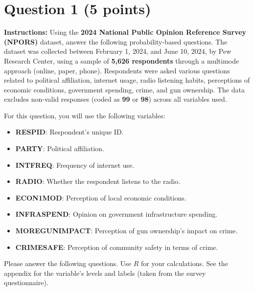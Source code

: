 \documentclass[11pt]{article}
\begin{document}
\newpage
\section*{Question 1 (5 points)}

\textbf{Instructions:} Using the \textbf{2024 National Public Opinion Reference Survey (NPORS)} dataset, answer the following probability-based questions. The dataset was collected between February 1, 2024, and June 10, 2024, by Pew Research Center, using a sample of \textbf{5,626 respondents} through a multimode approach (online, paper, phone). Respondents were asked various questions related to political affiliation, internet usage, radio listening habits, perceptions of economic conditions, government spending, crime, and gun ownership. The data excludes non-valid responses (coded as \textbf{99} or \textbf{98}) across all variables used.

For this question, you will use the following variables:
\begin{itemize}
    \item \textbf{RESPID}: Respondent’s unique ID.
    \item \textbf{PARTY}: Political affiliation.
    \item \textbf{INTFREQ}: Frequency of internet use.
    \item \textbf{RADIO}: Whether the respondent listens to the radio.
    \item \textbf{ECON1MOD}: Perception of local economic conditions.
    \item \textbf{INFRASPEND}: Opinion on government infrastructure spending.
    \item \textbf{MOREGUNIMPACT}: Perception of gun ownership's impact on crime.
    \item \textbf{CRIMESAFE}: Perception of community safety in terms of crime.
\end{itemize}

\noindent Please answer the following questions. Use $R$ for your calculations. See the appendix for the variable's levels and labels (taken from the survey questionnaire).
\end{document}
